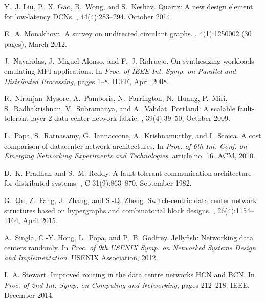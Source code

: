 \documentclass[]{amsart}
\begin{document}
{\begin{thebibliography}{10}
Y.~J. Liu, P.~X. Gao, B.~Wong, and S.~Keshav.
\newblock Quartz: A new design element for low-latency {DCN}s.
, 44(4):283--294, October
  2014.

E.~A. Monakhova.
\newblock A survey on undirected circulant graphs.
, 4(1):1250002
  (30 pages), March 2012.

J.~Navaridas, J.~Miguel-Alonso, and F.~J. Ridruejo.
\newblock On synthesizing workloads emulating {MPI} applications.
\newblock In {\em Proc. of IEEE Int. Symp. on Parallel and Distributed
  Processing}, pages 1--8. IEEE, April 2008.

R.~Niranjan~Mysore, A.~Pamboris, N.~Farrington, N.~Huang, P.~Miri,
  S.~Radhakrishnan, V.~Subramanya, and A.~Vahdat.
\newblock Portland: A scalable fault-tolerant layer-2 data center network
  fabric.
, 39(4):39--50, October
  2009.

L.~Popa, S.~Ratnasamy, G.~Iannaccone, A.~Krishnamurthy, and I.~Stoica.
\newblock A cost comparison of datacenter network architectures.
\newblock In {\em Proc. of 6th Int. Conf. on Emerging Networking Experiments
  and Technologies}, article no. 16. ACM, 2010.

D.~K. Pradhan and S.~M. Reddy.
\newblock A fault-tolerant communication architecture for distributed systems.
, C-31(9):863--870, September
  1982.

G.~Qu, Z.~Fang, J.~Zhang, and S.-Q. Zheng.
\newblock Switch-centric data center network structures based on hypergraphs
  and combinatorial block designs.
,
  26(4):1154--1164, April 2015.

A.~Singla, C.-Y. Hong, L.~Popa, and P.~B. Godfrey.
\newblock Jellyfish: Networking data centers randomly.
\newblock In {\em Proc. of 9th USENIX Symp. on Networked Systems Design and
  Implementation}. USENIX Association, 2012.

I.~A. Stewart.
\newblock Improved routing in the data centre networks {HCN} and {BCN}.
\newblock In {\em Proc. of 2nd Int. Symp. on Computing and Networking}, pages
  212--218. IEEE, December 2014.


\end{thebibliography}}
\end{document}
